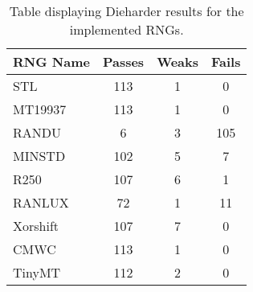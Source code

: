 \begin{table}[tb]
    \caption{Table displaying Dieharder results for the implemented RNGs.}
    \label{tab:speed}
    \begin{center}
        \begin{tabular}{l|ccc}
        \hline
        \hline
\textbf{RNG Name} & \textbf{Passes} & \textbf{Weaks} & \textbf{Fails} \\
        \hline
STL      & 113  & 1  &  0   \\
MT19937  & 113  & 1  &  0   \\
RANDU    & 6    & 3  &  105 \\
MINSTD   & 102  & 5  &  7   \\
R250     & 107  & 6  &  1   \\
RANLUX   & 72   & 1  &  11  \\
Xorshift & 107  & 7  &  0   \\
CMWC     & 113  & 1  &  0   \\
TinyMT   & 112  & 2  &  0   \\
        \hline
        \hline
        \end{tabular}
    \end{center}
\end{table}

